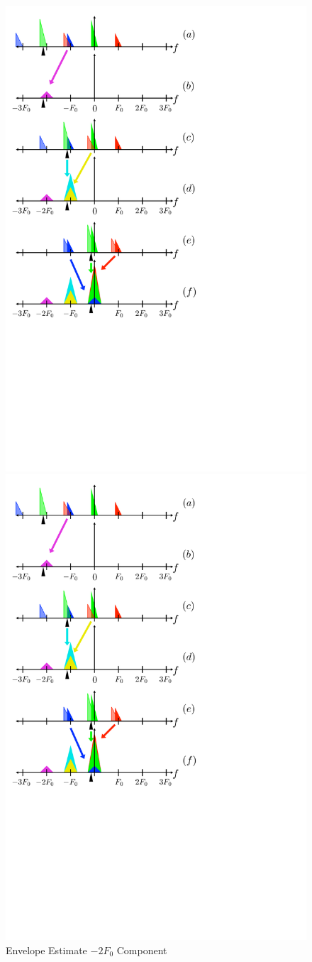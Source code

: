 \documentclass [11pt, proquest,oneside] {ganter_thesis}[2015/03/03]
\begin{document}
\begin{figure}[!ht]
   \centering
    \includegraphics[width=.62\textwidth]{harmonic_envelope_2F0}   
    \caption{Envelope Estimate $-2F_0$ Component}\label{fig:harmonic_envelope_2F0}
    \includegraphics[width=.62\textwidth]{harmonic_envelope_F0} 

\end{figure}
\end{document}
